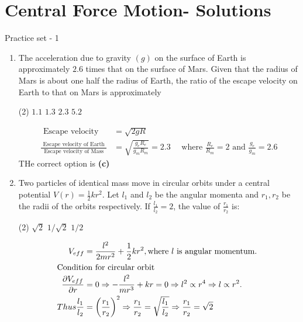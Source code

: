 \chapter{Central Force Motion- Solutions}
\begin{abox}
	Practice set - 1 
	\end{abox}
\begin{enumerate}
		\item The acceleration due to gravity $(g)$ on the surface of Earth is approximately $2.6$ times that on the surface of Mars. Given that the radius of Mars is about one half the radius of Earth, the ratio of the escape velocity on Earth to that on Mars is approximately
		{}
	\begin{tasks}(2)
		\task[\textbf{A.}] $1.1$
		\task[\textbf{B.}]$1.3$
		\task[\textbf{C.}]$2.3$
		\task[\textbf{D.}]$5.2$
	\end{tasks}
\begin{answer}
\begin{align*}
	\text { Escape velocity }&=\sqrt{2 g R}\\
\frac{\text { Escape velocity of Earth }}{\text { Escape velocity of Mass }}&=\sqrt{\frac{g_{e} R_{e}}{g_{m} R_{m}}}=2.3 \quad \text { where } \frac{R_{e}}{R_{m}}=2 \text { and } \frac{g_{e}}{g_{m}}=2.6
\end{align*}
	THe correct option is \textbf{(c)}
\end{answer}
	\item Two particles of identical mass move in circular orbits under a central potential $V(r)=\frac{1}{2} k r^{2}$. Let $l_{1}$ and $l_{2}$ be the angular momenta and $r_{1}, r_{2}$ be the radii of the orbits respectively. If $\frac{l_{1}}{l_{2}}=2$, the value of $\frac{r_{1}}{r_{2}}$ is:
	{}
\begin{tasks}(2)
	\task[\textbf{A.}] $\sqrt{2}$
	\task[\textbf{B.}]$1 / \sqrt{2}$
	\task[\textbf{D.}] $1 / 2$
\end{tasks}
\begin{answer}
	\begin{align*}
	 V_{e f f}&=\frac{l^{2}}{2 m r^{2}}+\frac{1}{2} k r^{2}, \text{where $l$ is angular momentum. }\\
	\intertext{Condition for circular orbit} \frac{\partial V_{e f f}}{\partial r}&=0 \Rightarrow-\frac{l^{2}}{m r^{3}}+k r=0 \Rightarrow l^{2} \propto r^{4} \Rightarrow l \propto r^{2}.\\
	Thus \frac{l_{1}}{l_{2}}&=\left(\frac{r_{1}}{r_{2}}\right)^{2} \Rightarrow \frac{r_{1}}{r_{2}}=\sqrt{\frac{l_{1}}{l_{2}}} \Rightarrow \frac{r_{1}}{r_{2}}=\sqrt{2}\\ 

\end{align*}
\end{answer}
\end{enumerate}
